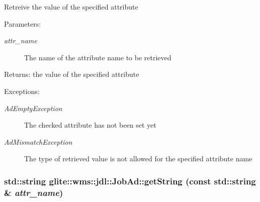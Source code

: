 Retreive the value of the specified attribute \begin{Desc}
\item[Parameters:]
\begin{description}
\item[{\em attr\_\-name}]The name of the attribute name to be retrieved \end{description}
\end{Desc}
\begin{Desc}
\item[Returns:]the value of the specified attribute \end{Desc}
\begin{Desc}
\item[Exceptions:]
\begin{description}
\item[{\em Ad\-Empty\-Exception}]The checked attribute has not been set yet \item[{\em Ad\-Mismatch\-Exception}]The type of retrieved value is not allowed for the specified attribute name \end{description}
\end{Desc}
\hypertarget{classglite_1_1wms_1_1jdl_1_1JobAd_z7_1}{
\subsubsection[getString]{\setlength{\rightskip}{0pt plus 5cm}std::string glite::wms::jdl::Job\-Ad::get\-String (const std::string \& {\em attr\_\-name})}}
\label{classglite_1_1wms_1_1jdl_1_1JobAd_z7_1}


